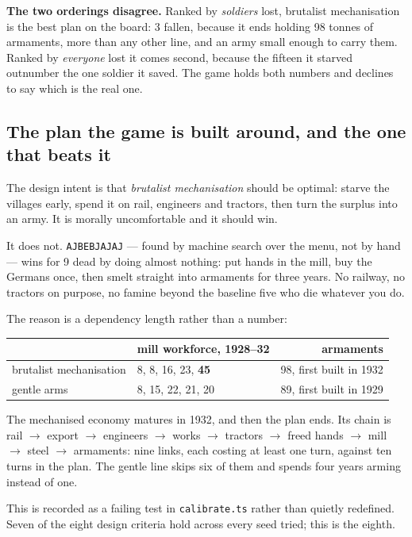 \documentclass[11pt,a4paper]{article}
\begin{document}
\textbf{The two orderings disagree.} Ranked by \emph{soldiers} lost, brutalist
mechanisation is the best plan on the board: 3 fallen, because it ends holding
98 tonnes of armaments, more than any other line, and an army small enough to
carry them. Ranked by \emph{everyone} lost it comes second, because the fifteen
it starved outnumber the one soldier it saved. The game holds both numbers and
declines to say which is the real one.

\subsection{The plan the game is built around, and the one that beats it}

The design intent is that \emph{brutalist mechanisation} should be optimal:
starve the villages early, spend it on rail, engineers and tractors, then turn
the surplus into an army. It is morally uncomfortable and it should win.

It does not. \texttt{AJBEBJAJAJ} --- found by machine search over the menu, not
by hand --- wins for 9 dead by doing almost nothing: put hands in the mill, buy
the Germans once, then smelt straight into armaments for three years. No
railway, no tractors on purpose, no famine beyond the baseline five who die
whatever you do.

The reason is a dependency length rather than a number:

\begin{center}
\footnotesize
\begin{tabular}{@{}llr@{}}
\toprule
& mill workforce, 1928--32 & armaments \\
\midrule
brutalist mechanisation & 8, 8, 16, 23, \textbf{45} & 98, first built in 1932 \\
gentle arms             & 8, 15, 22, 21, 20        & 89, first built in 1929 \\
\bottomrule
\end{tabular}
\end{center}

\noindent The mechanised economy matures in 1932, and then the plan ends. Its
chain is rail $\to$ export $\to$ engineers $\to$ works $\to$ tractors $\to$
freed hands $\to$ mill $\to$ steel $\to$ armaments: nine links, each costing at
least one turn, against ten turns in the plan. The gentle line skips six of
them and spends four years arming instead of one.

This is recorded as a failing test in \texttt{calibrate.ts} rather than
quietly redefined. Seven of the eight design criteria hold across every seed
tried; this is the eighth.
\end{document}
